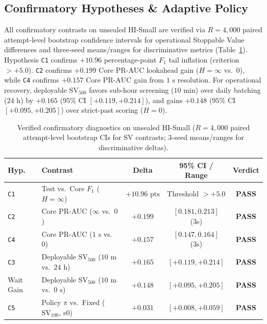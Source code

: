 \documentclass[sigconf,nonacm]{acmart}
\begin{document}
\subsection{Confirmatory Hypotheses \& Adaptive Policy}
All confirmatory contrasts on unsealed HI-Small are verified via $R = 4{,}000$ paired attempt-level bootstrap confidence intervals for operational Stoppable Value differences and three-seed means/ranges for discriminative metrics (Table~\ref{tab:hypotheses}). Hypothesis \texttt{C1} confirms $+10.96$ percentage-point $F_1$ tail inflation (criterion $> +5.0$). \texttt{C2} confirms $+0.199$ Core PR-AUC lookahead gain ($H=\infty$ vs.\ $0$), while \texttt{C4} confirms $+0.157$ Core PR-AUC gain from $1\text{ s}$ resolution. For operational recovery, deployable $\text{SV}_{500}$ favors sub-hour screening ($10\text{ min}$) over daily batching ($24\text{ h}$) by $+0.165$ ($95\%$ CI $[+0.119, +0.214]$), and gains $+0.148$ ($95\%$ CI $[+0.095, +0.205]$) over strict-past scoring ($H=0$).

\begin{table}[t]
\centering
\caption{Verified confirmatory diagnostics on unsealed HI-Small ($R = 4{,}000$ paired attempt-level bootstrap CIs for $\text{SV}$ contrasts; 3-seed means/ranges for discriminative deltas).}
\label{tab:hypotheses}
\scriptsize
\setlength{\tabcolsep}{2.2pt}
\begin{tabular}{llccc}
\toprule
\textbf{Hyp.} & \textbf{Contrast} & \textbf{Delta} & \textbf{95\% CI / Range} & \textbf{Verdict} \\
\midrule
\texttt{C1} & Test vs.\ Core $F_1$ ($H = \infty$) & $+10.96\text{ pts}$ & Threshold $> +5.0$ & \textbf{PASS} \\
\texttt{C2} & Core PR-AUC ($\infty$ vs.\ $0$) & $+0.199$ & $[0.181, 0.213]$ (3s) & \textbf{PASS} \\
\texttt{C4} & Core PR-AUC ($1\text{ s}$ vs.\ $0$) & $+0.157$ & $[0.147, 0.164]$ (3s) & \textbf{PASS} \\
\texttt{C3} & Deployable $\text{SV}_{500}$ ($10\text{ m}$ vs.\ $24\text{ h}$) & $+0.165$ & $[+0.119, +0.214]$ & \textbf{PASS} \\
Wait Gain & Deployable $\text{SV}_{500}$ ($10\text{ m}$ vs.\ $0\text{ s}$) & $+0.148$ & $[+0.095, +0.205]$ & \textbf{PASS} \\
\texttt{C5} & Policy $\pi$ vs.\ Fixed ($\text{SV}_{100}$, s0) & $+0.031$ & $[+0.008, +0.059]$ & \textbf{PASS} \\
\bottomrule
\end{tabular}
\end{table}
\end{document}

